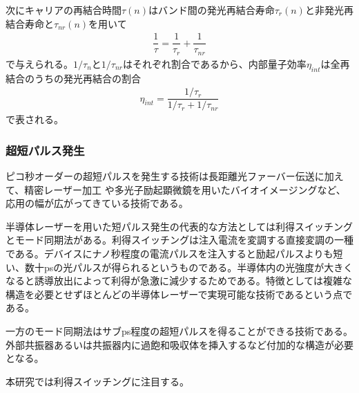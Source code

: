 次にキャリアの再結合時間$\tau(n)$はバンド間の発光再結合寿命$\tau_{r}(n)$と非発光再結合寿命と$\tau_{nr} (n)$を用いて
\begin{eqnarray}
\dfrac{1}{\tau}=\dfrac{1}{\tau_{r}}+\dfrac{1}{\tau_{nr}}
\label{eq:tau_r}
\end{eqnarray}
で与えられる。$1/\tau_{n}$と$1/\tau_{nr}$はそれぞれ割合であるから、内部量子効率$\eta_{int}$は全再結合のうちの発光再結合の割合
\begin{eqnarray}
\eta_{int}=\dfrac{1/\tau_{r}}{1/\tau_{r}+1/\tau_{nr}}
\end{eqnarray}
で表される。
\subsubsection{超短パルス発生}
ピコ秒オーダーの超短パルスを発生する技術は長距離光ファーバー伝送\cite{ref_hasegawa}に加えて、精密レーザー加工\cite{ref_chichkov} や多光子励起顕微鏡を用いたバイオイメージングなど、応用の幅が広がってきている技術である。

半導体レーザーを用いた短パルス発生の代表的な方法としては利得スイッチングとモード同期法がある。利得スイッチング\cite{ref_h_ito}は注入電流を変調する直接変調の一種である。デバイスにナノ秒程度の電流パルスを注入すると励起パルスよりも短い、数十psの光パルスが得られるというものである。半導体内の光強度が大きくなると誘導放出によって利得が急激に減少するためである。特徴としては複雑な構造を必要とせずほとんどの半導体レーザーで実現可能な技術であるという点である。

一方のモード同期法はサブps程度の超短パルスを得ることができる技術である。外部共振器あるいは共振器内に過飽和吸収体を挿入するなど付加的な構造が必要となる。

本研究では利得スイッチングに注目する。


